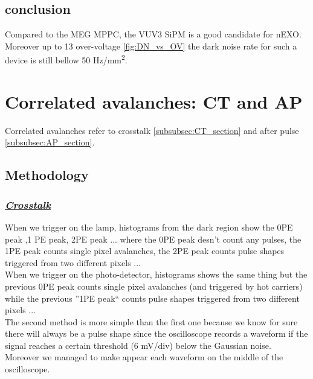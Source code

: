 \documentclass[a4paper, 11pt]{report}%
\begin{document}
  \subsection{conclusion}
  
  Compared to the MEG MPPC, the VUV3 SiPM is a good candidate for nEXO. Moreover up to 13 over-voltage \ref{fig:DN_vs_OV}
  the dark noise rate for such a device is still bellow 50 Hz/mm\textsuperscript{2}.
  
  \newpage
  
  \section{Correlated avalanches: CT and AP}\label{sec:correlated}
   
    
  
  Correlated avalanches refer to crosstalk \ref{subsubsec:CT_section} and after pulse \ref{subsubsec:AP_section}. 
  
  \subsection{Methodology}
  
  \subsubsection{\underline{\textit{Crosstalk}}}
  
  When we trigger on the lamp, histograms from the dark region show the 0PE peak ,1 PE peak, 2PE peak ... where the 0PE peak desn't count
  any pulses,
  the 1PE peak counts single pixel avalanches, the 2PE peak counts pulse shapes triggered from two different pixels ...\\
  When we trigger on the photo-detector, histograms shows the same thing but the previous 0PE peak counts single pixel avalanches
  (and triggered by hot carriers) while the previous ''1PE peak`` counts pulse shapes triggered from two different pixels ...\\
  The second method is more simple than the first one because we know for sure there will always be a pulse shape since the oscilloscope
  records a waveform if the signal reaches a certain threshold (6 mV/div) below the Gaussian noise.\\
  Moreover we managed to make appear each waveform on the middle of the oscilloscope.
  \\
  
\end{document}
